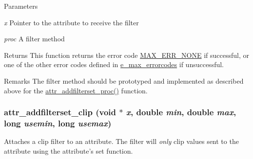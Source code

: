 \begin{DoxyParams}{Parameters}
\item[{\em x}]Pointer to the attribute to receive the filter \item[{\em proc}]A filter method\end{DoxyParams}
\begin{DoxyReturn}{Returns}
This function returns the error code \hyperlink{group__misc_gga0764dd6c02b76cca7d053ae50555d69da6d22f77fef8b1e1b074cef5d29d935fd}{MAX\_\-ERR\_\-NONE} if successful, or one of the other error codes defined in \hyperlink{group__misc_ga0764dd6c02b76cca7d053ae50555d69d}{e\_\-max\_\-errorcodes} if unsuccessful.
\end{DoxyReturn}
\begin{DoxyRemark}{Remarks}
The filter method should be prototyped and implemented as described above for the \hyperlink{group__attr_ga1d6d07565f278c27dd34824e253b9eb7}{attr\_\-addfilterset\_\-proc()} function. 
\end{DoxyRemark}
\hypertarget{group__attr_ga665f7148381f51b7f0fc97200e600e97}{
\subsubsection[{attr\_\-addfilterset\_\-clip}]{ attr\_\-addfilterset\_\-clip (void $\ast$ {\em x}, \/  double {\em min}, \/  double {\em max}, \/  long {\em usemin}, \/  long {\em usemax})}}
\label{group__attr_ga665f7148381f51b7f0fc97200e600e97}


Attaches a clip filter to an attribute. The filter will {\itshape only\/} clip values sent to the attribute using the attribute's {\ttfamily set} function.


